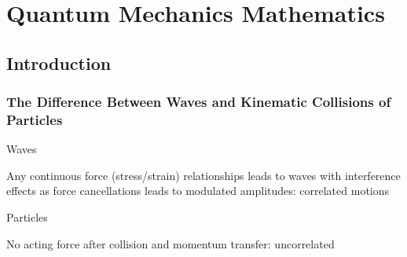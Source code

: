 \documentclass[11pt,fleqn]{book}
\begin{document}
\chapter{Quantum Mechanics Mathematics}

\section{Introduction}
\subsection*{The Difference Between Waves and Kinematic
Collisions of Particles}
\begin{descriptions}
    \item[Waves]
    \begin{descriptions}
    \end{descriptions}
    Any continuous force (stress/strain) relationships leads to waves with interference effects as force cancellations leads to modulated amplitudes: correlated motions
    \item[Particles]
    \begin{descriptions}
    \end{descriptions}
    No acting force after collision and momentum transfer: uncorrelated
\end{descriptions}
\end{document}
